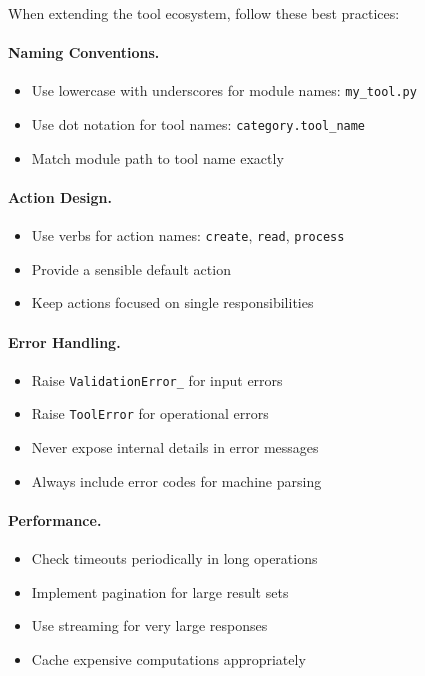 When extending the tool ecosystem, follow these best practices:

\paragraph{Naming Conventions.}
\begin{itemize}
    \item Use lowercase with underscores for module names: \texttt{my\_tool.py}
    \item Use dot notation for tool names: \texttt{category.tool\_name}
    \item Match module path to tool name exactly
\end{itemize}

\paragraph{Action Design.}
\begin{itemize}
    \item Use verbs for action names: \texttt{create}, \texttt{read}, \texttt{process}
    \item Provide a sensible default action
    \item Keep actions focused on single responsibilities
\end{itemize}

\paragraph{Error Handling.}
\begin{itemize}
    \item Raise \texttt{ValidationError\_} for input errors
    \item Raise \texttt{ToolError} for operational errors
    \item Never expose internal details in error messages
    \item Always include error codes for machine parsing
\end{itemize}

\paragraph{Performance.}
\begin{itemize}
    \item Check timeouts periodically in long operations
    \item Implement pagination for large result sets
    \item Use streaming for very large responses
    \item Cache expensive computations appropriately
\end{itemize}

